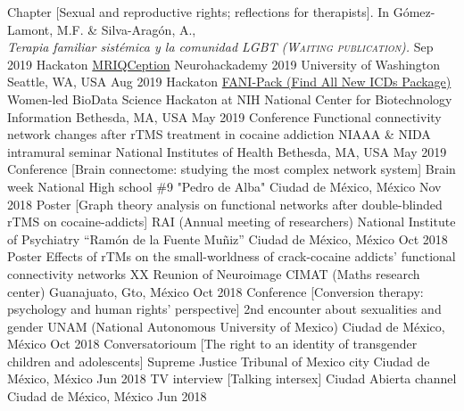 \begin{cvproceedings}
    \cvproceeding
        {Chapter}
        {[Sexual and reproductive rights; reflections for therapists]. In Gómez-Lamont, M.F. \& Silva-Aragón, A., \\\slshape{\color{awesome}Terapia familiar sistémica y la comunidad LGBT} (\scshape{Waiting publication}).}
        {}
        {}
        {}
        {Sep 2019}
    \cvproceeding
        {Hackaton}
        {\href{https://github.com/elizabethbeard/mriqception}{MRIQCeption}}
        {Neurohackademy 2019}
        {University of Washington}
        {Seattle, WA, USA}
        {Aug 2019}
    \cvproceeding
        {Hackaton}
        {\href{https://github.com/NCBI-Hackathons/Design-of-ICD-9-to-10-conversion-function-for-the-R-package-icd}{FANI-Pack (Find All New ICDs Package)}}
        {Women-led BioData Science Hackaton at NIH}
        {National Center for Biotechnology Information}
        {Bethesda, MA, USA}
        {May 2019}
    \cvproceeding
        {Conference}
        {Functional connectivity network changes after rTMS treatment in cocaine addiction}
        {NIAAA \& NIDA intramural seminar}
        {National Institutes of Health}
        {Bethesda, MA, USA}
        {May 2019}
    \cvproceeding
        {Conference}
        {[Brain connectome: studying the most complex network system]}
        {Brain week}
        {National High school \#9 "Pedro de Alba"}
        {Ciudad de México, México}
        {Nov 2018}
    \cvproceeding
        {Poster}
        {[Graph theory analysis on functional networks after double-blinded rTMS on cocaine-addicts]}
        {RAI (Annual meeting of researchers)}
        {National Institute of Psychiatry ``Ramón de la Fuente Muñiz''}
        {Ciudad de México, México}
        {Oct 2018}
    \cvproceeding
        {Poster}
        {Effects of rTMs on the small-worldness of crack-cocaine addicts' functional connectivity networks}
        {XX Reunion of Neuroimage}
        {CIMAT (Maths research center)}
        {Guanajuato, Gto, México}
        {Oct 2018}
    \cvproceeding
        {Conference}
        {[Conversion therapy: psychology and human rights' perspective]}
        {2nd encounter about sexualities and gender}
        {UNAM (National Autonomous University of Mexico)}
        {Ciudad de México, México}
        {Oct 2018}
    \cvproceeding
        {Conversatorioum}
        {[The right to an identity of transgender children and adolescents]}
        {}
        {Supreme Justice Tribunal of Mexico city}
        {Ciudad de México, México}
        {Jun 2018}
    \cvproceeding
        {TV interview}
        {[Talking intersex]}
        {}
        {Ciudad Abierta channel}
        {Ciudad de México, México}
        {Jun 2018}
\end{cvproceedings}
